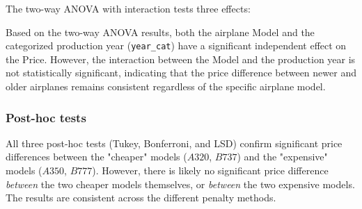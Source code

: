 The two-way ANOVA with interaction tests three effects:


Based on the two-way ANOVA results, both the airplane Model and the categorized production year (\texttt{year\_cat}) have a significant independent effect on the Price. However, the interaction between the Model and the production year is not statistically significant, indicating that the price difference between newer and older airplanes remains consistent regardless of the specific airplane model.

\subsubsection*{Post-hoc tests}
All three post-hoc tests (Tukey, Bonferroni, and LSD) confirm significant price differences between the "cheaper" models ($A320$, $B737$) and the "expensive" models ($A350$, $B777$). However, there is likely no significant price difference \textit{between} the two cheaper models themselves, or \textit{between} the two expensive models. The results are consistent across the different penalty methods.